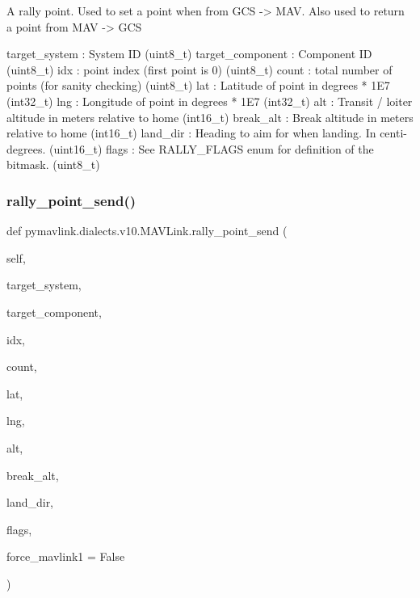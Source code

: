 \begin{DoxyVerb}
\begin{DoxyVerb}
\begin{DoxyVerb}
\begin{DoxyVerb}
\begin{DoxyVerb}A rally point. Used to set a point when from GCS -> MAV. Also used to
return a point from MAV -> GCS

target_system             : System ID (uint8_t)
target_component          : Component ID (uint8_t)
idx                       : point index (first point is 0) (uint8_t)
count                     : total number of points (for sanity checking) (uint8_t)
lat                       : Latitude of point in degrees * 1E7 (int32_t)
lng                       : Longitude of point in degrees * 1E7 (int32_t)
alt                       : Transit / loiter altitude in meters relative to home (int16_t)
break_alt                 : Break altitude in meters relative to home (int16_t)
land_dir                  : Heading to aim for when landing. In centi-degrees. (uint16_t)
flags                     : See RALLY_FLAGS enum for definition of the bitmask. (uint8_t)\end{DoxyVerb}
 \mbox{\label{classpymavlink_1_1dialects_1_1v10_1_1MAVLink_a57e592af9dd4df45eb589b549f1fff00}} 
\subsubsection{\texorpdfstring{rally\+\_\+point\+\_\+send()}{rally\_point\_send()}}
{\footnotesize\ttfamily def pymavlink.\+dialects.\+v10.\+M\+A\+V\+Link.\+rally\+\_\+point\+\_\+send (\begin{DoxyParamCaption}\item[{}]{self,  }\item[{}]{target\+\_\+system,  }\item[{}]{target\+\_\+component,  }\item[{}]{idx,  }\item[{}]{count,  }\item[{}]{lat,  }\item[{}]{lng,  }\item[{}]{alt,  }\item[{}]{break\+\_\+alt,  }\item[{}]{land\+\_\+dir,  }\item[{}]{flags,  }\item[{}]{force\+\_\+mavlink1 = {\ttfamily False} }\end{DoxyParamCaption})}


\end{DoxyVerb}
\end{DoxyVerb}
\end{DoxyVerb}
\end{DoxyVerb}
